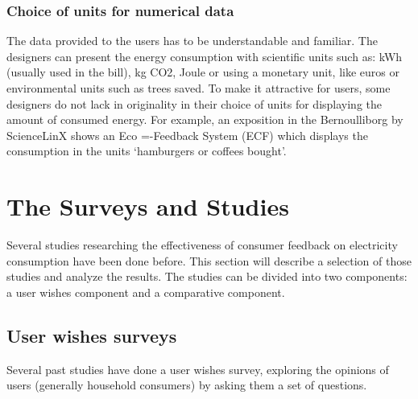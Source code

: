 \documentclass[journal]{vgtc}                %
\begin{document}
\subsubsection{Choice of units for numerical data}
The data provided to the users has to be understandable and familiar. The designers can present the energy consumption with scientific units such as: kWh (usually used in the bill), kg CO2, Joule or using a monetary unit, like euros or environmental units such as trees saved.
To make it attractive for users, some designers do not lack in originality in their choice of units for displaying the amount of consumed energy. For example, an exposition in the Bernoulliborg by ScienceLinX shows an Eco =-Feedback System (ECF) which displays the consumption in the units ‘hamburgers or coffees bought’.


\section{The Surveys and Studies}
Several studies researching the effectiveness of consumer feedback on electricity consumption have been done before.
This section will describe a selection of those studies and analyze the results.
The studies can be divided into two components: a user wishes component and a comparative component.

\subsection{User wishes surveys}
Several past studies have done a user wishes survey, exploring the opinions of users (generally household consumers) by asking them a set of questions. 
\end{document}
